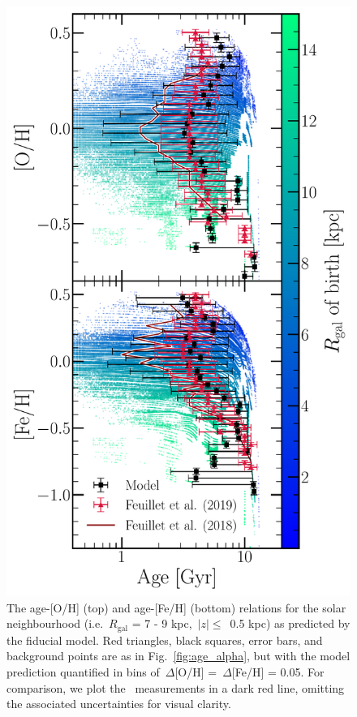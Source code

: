 \documentclass[draft2.tex]{subfiles}
\begin{document}
\begin{figure} 
\centering 
\includegraphics[scale = 0.45]{amr_solar_annulus.pdf} 
\caption{The age-[O/H] (top) and age-[Fe/H] (bottom) relations for the solar 
neighbourhood (i.e.~$R_\text{gal}$ = 7 - 9 kpc,~$\left|z\right|\leq$~0.5 kpc) 
as predicted by the fiducial model. Red triangles, black squares, error bars, 
and background points are as in Fig.~\ref{fig:age_alpha}, but with the model 
prediction quantified in bins of~$\Delta$[O/H] =~$\Delta$[Fe/H] = 0.05. For 
comparison, we plot the~\citet{Feuillet2018} measurements in a dark red line, 
omitting the associated uncertainties for visual clarity. } 
\label{fig:amr_solar_annulus} 
\end{figure} 
\end{document}
